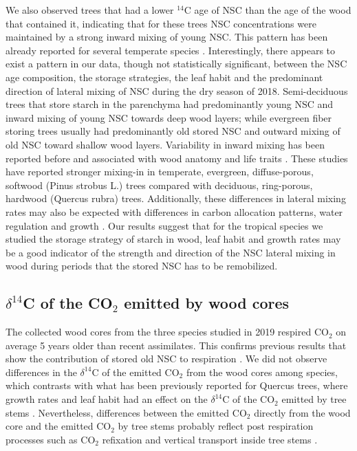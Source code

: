 \documentclass{article}
\begin{document}
We also observed trees that had a lower $^{14}$C age of NSC than the age of the wood that contained it, indicating that for these trees NSC concentrations were maintained by a strong inward mixing of young NSC. This pattern has been already reported for several temperate species \citep{Richardson:2015, Trumbore:2015, Fuze2020}. Interestingly, there appears to exist a pattern in our data, though not statistically significant, between the NSC age composition, the storage strategies, the leaf habit and the predominant direction of lateral mixing of NSC during the dry season of 2018. Semi-deciduous trees that store starch in the parenchyma had predominantly young NSC and inward mixing of young NSC towards deep wood layers; while evergreen fiber storing trees usually had predominantly old stored NSC and outward mixing of old NSC toward shallow wood layers. Variability in inward mixing has been reported before and associated with wood anatomy and life traits  \citep{Richardson:2015, Trumbore:2015}. These studies have reported stronger mixing-in in temperate, evergreen, diffuse-porous, softwood (Pinus strobus L.) trees compared with deciduous, ring-porous, hardwood (Quercus rubra) trees. Additionally, these differences in lateral mixing rates may also be expected with differences in carbon allocation patterns, water regulation and growth \citep{mcdowell:2008, carbone:2013, Hartmann:2015}. Our results suggest that for the tropical species we studied the storage strategy of starch in wood, leaf habit and growth rates may be a good indicator of the strength and direction of the NSC lateral mixing in wood during periods that the stored NSC has to be remobilized.

\subsection{$\delta^{14}$C of the CO$_2$ emitted by wood cores}

The collected wood cores from the three species studied in 2019 respired CO$_{2}$ on average 5 years older than recent assimilates. This confirms previous results that show the contribution of stored old NSC to respiration \citep{Varga:2009, carbone:2013,  muhr:2013, Trumbore:2015}. We did not observe differences in the $\delta^{14}$C of the emitted CO$_{2}$ from the wood cores among species, which contrasts with what has been previously reported for Quercus trees, where growth rates and leaf habit had an effect on the $\delta^{14}$C of the CO$_{2}$ emitted by tree stems  \citep{Trumbore:2015}. Nevertheless, differences between the emitted CO$_{2}$ directly from the wood core and the emitted CO$_{2}$ by tree stems probably reflect post respiration processes such as CO$_{2}$ refixation and vertical transport inside tree stems \citep{muhr:2013}.
\end{document}

